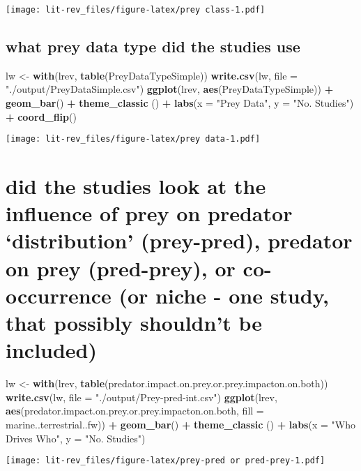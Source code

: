 \documentclass[
]{article}
\newenvironment{Shaded}{\begin{snugshade}}{\end{snugshade}}
\newcommand{\DataTypeTok}[1]{\textcolor[rgb]{0.13,0.29,0.53}{#1}}
\newcommand{\KeywordTok}[1]{\textcolor[rgb]{0.13,0.29,0.53}{\textbf{#1}}}
\newcommand{\NormalTok}[1]{#1}
\newcommand{\OperatorTok}[1]{\textcolor[rgb]{0.81,0.36,0.00}{\textbf{#1}}}
\newcommand{\StringTok}[1]{\textcolor[rgb]{0.31,0.60,0.02}{#1}}
\begin{document}
\texttt{[image: lit-rev\_files/figure-latex/prey class-1.pdf]}

\hypertarget{what-prey-data-type-did-the-studies-use}{%
\subsection{what prey data type did the studies
use}\label{what-prey-data-type-did-the-studies-use}}

\begin{Shaded}
\begin{Highlighting}[]
\NormalTok{lw <-}\StringTok{ }\KeywordTok{with}\NormalTok{(lrev, }\KeywordTok{table}\NormalTok{(PreyDataTypeSimple))}
\KeywordTok{write.csv}\NormalTok{(lw, }\DataTypeTok{file =} \StringTok{"./output/PreyDataSimple.csv"}\NormalTok{)}
\KeywordTok{ggplot}\NormalTok{(lrev, }\KeywordTok{aes}\NormalTok{(PreyDataTypeSimple)) }\OperatorTok{+}\StringTok{ }\KeywordTok{geom_bar}\NormalTok{() }\OperatorTok{+}\StringTok{ }\KeywordTok{theme_classic}\NormalTok{ () }\OperatorTok{+}\StringTok{ }\KeywordTok{labs}\NormalTok{(}\DataTypeTok{x =} \StringTok{"Prey Data"}\NormalTok{, }\DataTypeTok{y =} \StringTok{"No. Studies"}\NormalTok{) }\OperatorTok{+}\StringTok{ }\KeywordTok{coord_flip}\NormalTok{()}
\end{Highlighting}
\end{Shaded}

\texttt{[image: lit-rev\_files/figure-latex/prey data-1.pdf]}

\hypertarget{did-the-studies-look-at-the-influence-of-prey-on-predator-distribution-prey-pred-predator-on-prey-pred-prey-or-co-occurrence-or-niche---one-study-that-possibly-shouldnt-be-included}{%
\section{did the studies look at the influence of prey on predator
`distribution' (prey-pred), predator on prey (pred-prey), or
co-occurrence (or niche - one study, that possibly shouldn't be
included)}\label{did-the-studies-look-at-the-influence-of-prey-on-predator-distribution-prey-pred-predator-on-prey-pred-prey-or-co-occurrence-or-niche---one-study-that-possibly-shouldnt-be-included}}

\begin{Shaded}
\begin{Highlighting}[]
\NormalTok{lw <-}\StringTok{ }\KeywordTok{with}\NormalTok{(lrev, }\KeywordTok{table}\NormalTok{(predator.impact.on.prey.or.prey.impacton.on.both))}
\KeywordTok{write.csv}\NormalTok{(lw, }\DataTypeTok{file =} \StringTok{"./output/Prey-pred-int.csv"}\NormalTok{)}
\KeywordTok{ggplot}\NormalTok{(lrev, }\KeywordTok{aes}\NormalTok{(predator.impact.on.prey.or.prey.impacton.on.both, }\DataTypeTok{fill =}\NormalTok{ marine..terrestrial..fw)) }\OperatorTok{+}\StringTok{ }\KeywordTok{geom_bar}\NormalTok{() }\OperatorTok{+}\StringTok{ }\KeywordTok{theme_classic}\NormalTok{ () }\OperatorTok{+}\StringTok{ }\KeywordTok{labs}\NormalTok{(}\DataTypeTok{x =} \StringTok{"Who Drives Who"}\NormalTok{, }\DataTypeTok{y =} \StringTok{"No. Studies"}\NormalTok{)}
\end{Highlighting}
\end{Shaded}

\texttt{[image: lit-rev\_files/figure-latex/prey-pred or pred-prey-1.pdf]}
\end{document}
